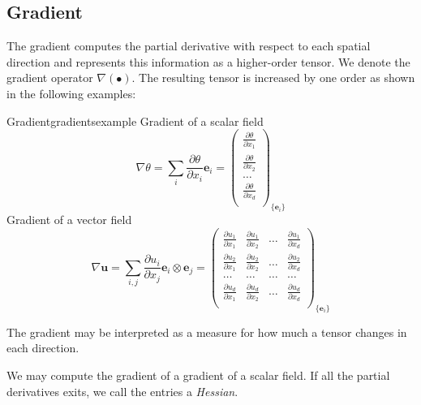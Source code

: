 \subsection{Gradient}
The gradient computes the partial derivative with respect to each spatial direction and represents this information as a higher-order tensor. We denote the gradient operator $\nabla (\bullet)$. The resulting tensor is increased by one order as shown in the following examples:
\begin{example}{Gradient}{gradientsexample}
    Gradient of a scalar field
    \begin{equation}
        \nabla \theta = \sum_i \frac{\partial \theta}{\partial x_i} \mathbf{e}_i =
        \begin{pmatrix}
            \frac{\partial \theta}{\partial x_1} \\
            \frac{\partial \theta}{\partial x_2} \\
            \dots \\
            \frac{\partial \theta}{\partial x_d} \\
        \end{pmatrix}_{\{\mathbf{e}_i\}}
    \end{equation}
    Gradient of a vector field
    \begin{equation}
        \nabla \mathbf{u} = \sum_{i,j} \frac{\partial u_i}{\partial x_j} \mathbf{e}_i \otimes \mathbf{e}_j
        = 
        \begin{pmatrix}
            \frac{\partial u_1}{\partial x_1} & \frac{\partial u_1}{\partial x_2} & \dots & \frac{\partial u_1}{\partial x_d}\\
            \frac{\partial u_2}{\partial x_1} & \frac{\partial u_2}{\partial x_2} & \dots & \frac{\partial u_2}{\partial x_d}\\
            \dots & \dots & \dots & \dots\\
            \frac{\partial u_d}{\partial x_1} & \frac{\partial u_d}{\partial x_2} & \dots & \frac{\partial u_d}{\partial x_d}\\
        \end{pmatrix}_{\{\mathbf{e}_i\}}
    \end{equation}
\end{example}

The gradient may be interpreted as a measure for how much a tensor changes in each direction. 

We may compute the gradient of a gradient of a scalar field. If all the partial derivatives exits, we call the entries a \emph{Hessian}.

